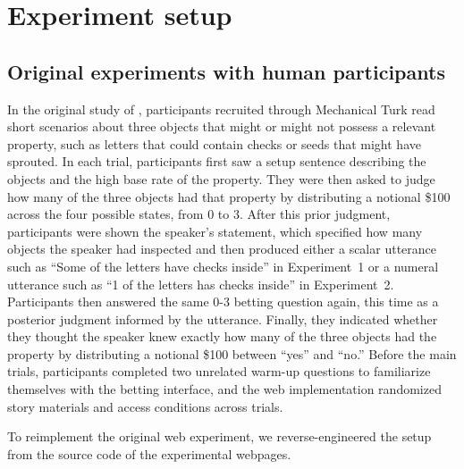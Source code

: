 \documentclass[11pt]{article}
\begin{document}
\section{Experiment setup}
\subsection{Original experiments with human participants}
In the original study of \citet{goodmanstuhlmuller2013}, participants recruited through Mechanical Turk 
read short scenarios about three objects that might or might not possess a relevant property, 
such as letters that could contain checks or seeds that might have sprouted. In each trial, 
participants first saw a setup sentence describing the objects and the high base rate of the property. 
They were then asked to judge how many of the three objects had that property by distributing 
a notional \$100 across the four possible states, from 0 to 3. After this prior judgment, 
participants were shown the speaker's statement, which specified how many objects the speaker 
had inspected and then produced either a scalar utterance such as ``Some of the letters have checks 
inside'' in Experiment~1 or a numeral utterance such as ``1 of the letters has checks inside'' in 
Experiment~2. Participants then answered the same 0-3 betting question again, this time as a posterior 
judgment informed by the utterance. Finally, they indicated whether they thought the speaker knew exactly 
how many of the three objects had the property by distributing a notional \$100 between ``yes'' and ``no.'' 
Before the main trials, participants completed two unrelated warm-up questions 
to familiarize themselves with the betting interface, and the web implementation randomized story 
materials and access conditions across trials.

To reimplement the original web experiment, we reverse-engineered the setup from the source code of 
the experimental webpages. 
\end{document}
